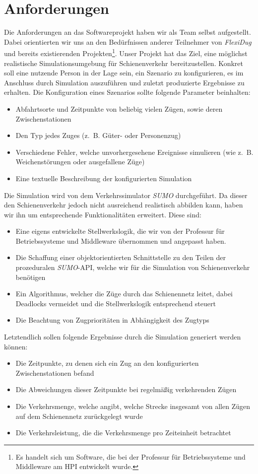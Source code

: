 \section{Anforderungen}
Die Anforderungen an das Softwareprojekt haben wir als Team selbst aufgestellt. Dabei orientierten wir uns an den Bedürfnissen anderer Teilnehmer von \emph{FlexiDug} und bereits existierenden Projekten\footnote{Es handelt sich um Software, die bei der Professur für Betriebssysteme und Middleware am HPI entwickelt wurde.}. Unser Projekt hat das Ziel, eine möglichst realistische Simulationsumgebung für Schienenverkehr bereitzustellen. Konkret soll eine nutzende Person in der Lage sein, ein Szenario zu konfigurieren, es im Anschluss durch Simulation auszuführen und zuletzt produzierte Ergebnisse zu erhalten. Die Konfiguration eines Szenarios sollte folgende Parameter beinhalten:
\begin{itemize}
    \item Abfahrtsorte und Zeitpunkte von beliebig vielen Zügen, sowie deren Zwischenstationen
    \item Den Typ jedes Zuges (z.~B. Güter- oder Personenzug)
    \item Verschiedene Fehler, welche unvorhergesehene Ereignisse simulieren (wie z.~B. Weichenstörungen oder ausgefallene Züge)
    \item Eine textuelle Beschreibung der konfigurierten Simulation
\end{itemize}
Die Simulation wird von dem Verkehrssimulator \emph{SUMO} \cite{noauthor_eclipse_nodate} durchgeführt. Da dieser den Schienenverkehr jedoch nicht ausreichend realistisch abbilden kann, haben wir ihn um entsprechende Funktionalitäten erweitert. Diese sind:
\begin{itemize}
    \item Eine eigens entwickelte Stellwerkslogik, die wir von der Professur für Betriebssysteme und Middleware übernommen und angepasst haben. \cite{noauthor_interlocking_2023}
    \item Die Schaffung einer objektorientierten Schnittstelle zu den Teilen der prozeduralen \emph{SUMO}-API, welche wir für die Simulation von Schienenverkehr benötigen
    \item Ein Algorithmus, welcher die Züge durch das Schienennetz leitet, dabei Deadlocks vermeidet und die Stellwerkslogik entsprechend steuert
    \item Die Beachtung von Zugprioritäten in Abhängigkeit des Zugtyps
\end{itemize}
Letztendlich sollen folgende Ergebnisse durch die Simulation generiert werden können:
\begin{itemize}
    \item Die Zeitpunkte, zu denen sich ein Zug an den konfigurierten Zwischenstationen befand
    \item Die Abweichungen dieser Zeitpunkte bei regelmäßig verkehrenden Zügen
    \item Die Verkehrsmenge, welche angibt, welche Strecke insgesamt von allen Zügen auf dem Schienennetz zurückgelegt wurde
    \item Die Verkehrsleistung, die die Verkehrsmenge pro Zeiteinheit betrachtet
\end{itemize}

